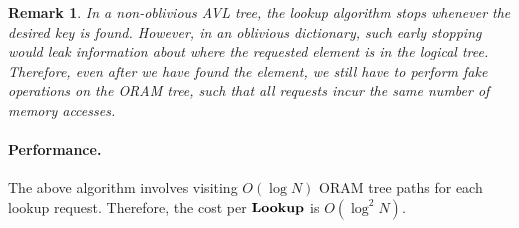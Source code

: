 \documentclass[11pt]{article}
\newtheorem{remark}{Remark}
\begin{document}
\begin{remark}
In a non-oblivious AVL tree, the lookup algorithm 
stops whenever the desired key is found.
However, in an oblivious dictionary, such early stopping
would leak information 
about where the 
requested element
is in the logical tree. 
Therefore, even after we have found
the element, we still have to perform fake
operations on the ORAM tree, such that all requests 
incur the same number of memory accesses.
\end{remark}

\paragraph{Performance.}
The above algorithm involves visiting
$O(\log N)$ ORAM tree paths for each lookup request. 
Therefore, the cost per ${\bf Lookup}$ is $O(\log^2 N)$.





\end{document}
